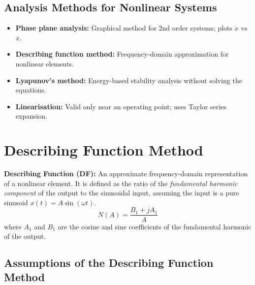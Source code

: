 \documentclass[12pt,a4paper]{article}
\begin{document}
\subsection{Analysis Methods for Nonlinear Systems}

\begin{itemize}[leftmargin=*, itemsep=3pt]
  \item \textbf{Phase plane analysis:} Graphical method for 2nd order systems; plots $\dot{x}$ vs $x$.
  \item \textbf{Describing function method:} Frequency-domain approximation for nonlinear elements.
  \item \textbf{Lyapunov's method:} Energy-based stability analysis without solving the equations.
  \item \textbf{Linearisation:} Valid only near an operating point; uses Taylor series expansion.
\end{itemize}

\section{Describing Function Method}

\begin{tcolorbox}[defbox]
\textbf{Describing Function (DF):} An approximate frequency-domain representation of a nonlinear element. It is defined as the ratio of the \textit{fundamental harmonic component} of the output to the sinusoidal input, assuming the input is a pure sinusoid $x(t) = A\sin(\omega t)$.
$$N(A) = \frac{B_1 + jA_1}{A}$$
where $A_1$ and $B_1$ are the cosine and sine coefficients of the fundamental harmonic of the output.
\end{tcolorbox}

\subsection{Assumptions of the Describing Function Method}
\end{document}

